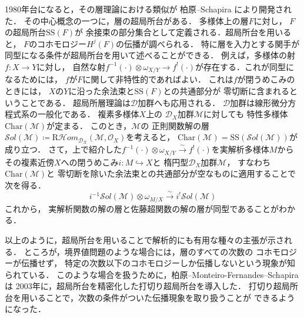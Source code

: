 ﻿\documentclass[a4paper]{jsarticle}
\theoremstyle{definition}
\newcommand{\mcal}{\mathcal}
\numberwithin{equation}{section}
\newcommand{\cD}{\mcal{D}}
\newcommand{\simar}{\mathrel{\overset{\sim}{\rightarrow}}}%
\theoremstyle{mystyle}
\begin{document}
1980年台になると，その層理論における類似が
柏原--Schapira により開発された\cite{KS90}．
その中心概念の一つに，層の超局所台がある．
多様体上の層\(F\)に対し，
\(F\)の超局所台\(\mathrm{SS}(F)\)が
余接束の部分集合として定義される．超局所台を用いると，
\(F\)のコホモロジー\(H^{j}(F)\)の伝播が調べられる．
特に層を入力とする関手が同型になる条件が超局所台を用いて述べることができる．
例えば，多様体の射\(f\colon X\to Y\)に対し，
自然な射\(
  f^{-1}(\cdot)\otimes \omega_{X/Y}
  \to f^{!}(\cdot)
\)が存在する．これが同型になるためには，
\(f\)が\(F\)に関して非特性的であればよい．
これは\(f\)が閉うめこみのときには，
\(X\)の\(Y\)に沿った余法束と\(\mathrm{SS}(F)\)との共通部分が
零切断に含まれるということである．
超局所層理論は\(\mathcal{D}\)加群へも応用される．
\(\mathcal{D}\)加群は線形微分方程式系の一般化である．
複素多様体\(X\)上の
\(\mathcal{D}_{X}\)加群\(\mathcal{M}\)に対しても
特性多様体\(\mathrm{Char}(\mathcal{M})\)が定まる．
このとき，\(\mathcal{M}\)の
正則関数解の層\(
  \mathcal{S}ol(\mathcal{M})\coloneqq 
  \mathrm{R}\mathcal{H}om_{\mathcal{D}_{X}}(\mathcal{M},\mathcal{O}_{X})
\)を考えると，
\(\mathrm{Char}(\mathcal{M})=\mathrm{SS}(\mathcal{S}ol(\mathcal{M}))\)が成り立つ．
さて，上で紹介した\(
  f^{-1}(\cdot)\otimes \omega_{X/Y}
  \simar f^{!}(\cdot)
\)を実解析多様体\(M\)から
その複素近傍\(X\)への閉うめこみ\(i\colon M\hookrightarrow X\)と
楕円型\(\cD_{X}\)加群\(\mathcal{M}\)，
すなわち\(\mathrm{Char}(\mathcal{M})\)と
零切断を除いた余法束との共通部分が空なものに適用することで次を得る．
\[
  i^{-1}\mathcal{S}ol(\mathcal{M})\otimes \omega_{M/X}
  \overset{\sim}{\to}
  i^{!}\mathcal{S}ol(\mathcal{M})
\]これから，
実解析関数の解の層と佐藤超関数の解の層が同型であることがわかる．

以上のように，超局所台を用いることで解析的にも有用な種々の主張が示される．
ところが，境界値問題のような場合には，層のすべての次数の
コホモロジーが伝播せず，
特定の次数以下のコホモロジーしか伝播しないという現象が知られている．
このような場合を扱うために，柏原--Monteiro-Fernandes--Schapira は
2003年に，超局所台を精密化した打切り超局所台を導入した\cite{KFS03a}．
打切り超局所台を用いることで，次数の条件がついた伝播現象を取り扱うことが
できるようになった．
\end{document}
